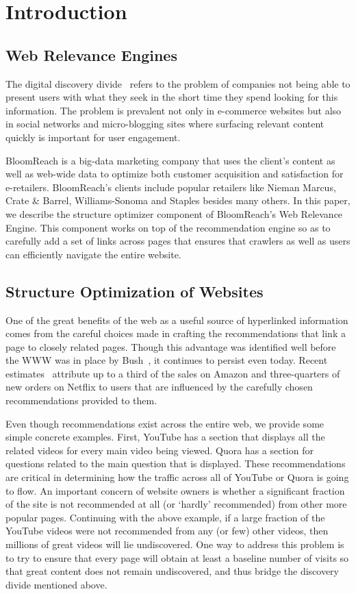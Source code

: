 \section{Introduction}

\subsection{Web Relevance Engines}
The digital discovery divide~\cite{WebRelevanceEngine} refers to the problem of companies not being able to present users with what they seek in the short time they spend looking for this information.
The problem is prevalent not only in e-commerce websites but also in social networks and micro-blogging sites where surfacing relevant content quickly is important for user engagement. \vs

BloomReach is a big-data marketing company that uses the client's content as well as web-wide data to optimize both customer acquisition and satisfaction for e-retailers.
BloomReach's clients include popular retailers like Nieman Marcus, Crate \& Barrel, Williams-Sonoma and Staples besides many others. In this paper, we describe the structure optimizer component of BloomReach's Web Relevance Engine.
This component works on top of the recommendation engine so as to carefully add a set of links across pages that ensures that crawlers as well as users can efficiently navigate the entire website.

\subsection{Structure Optimization of Websites}

One of the great benefits of the web as a useful source of hyperlinked
information comes from the careful choices made in crafting the
recommendations that link a page to closely related pages. Though this
advantage was identified well before the WWW was in place by
Bush~\cite{Bush45aswe}, it continues to persist even today.
Recent estimates~\cite{big-data-book13} attribute up to a third of the sales
on Amazon and three-quarters of new orders on Netflix to users that are
influenced by the carefully chosen recommendations provided to them. \vs

Even though recommendations exist across the entire web, we provide some simple concrete examples. First, YouTube has a section that displays all the related videos for every main video being viewed.
Quora has a section for questions related to the main question that is displayed. These recommendations are critical in determining how the traffic across all of YouTube or Quora is going to flow.
An important concern of website owners is whether a significant fraction of the site is not recommended at all (or `hardly' recommended) from other more popular pages. Continuing
with the above example, if a large fraction of the YouTube videos were not recommended from any (or few) other videos, then millions of great videos will lie undiscovered. One way to address this
problem is to try to ensure that every page will obtain at least a baseline number of visits so that great content does not remain undiscovered, and thus bridge the discovery divide mentioned above. \vs

